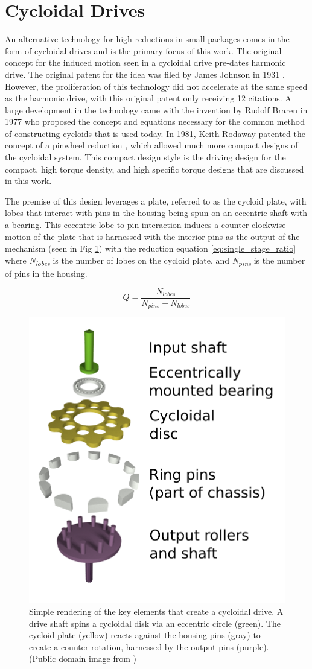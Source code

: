 \section{Cycloidal Drives} \label{intro:cycloid}

An alternative technology for high reductions in small packages comes in the form of cycloidal drives and is the primary focus of this work. The original concept for the induced motion seen in a cycloidal drive pre-dates harmonic drive. The original patent for the idea was filed by James Johnson in 1931 \cite{ref:cycloid_original}. However, the proliferation of this technology did not accelerate at the same speed as the harmonic drive, with this original patent only receiving 12 citations. A large development in the technology came with the invention by Rudolf Braren in 1977 \cite{ref:cycloid_one_stage} who proposed the concept and equations necessary for the common method of constructing cycloids that is used today. In 1981, Keith Rodaway patented the concept of a pinwheel reduction \cite{ref:cycloid_pinwheel}, which allowed much more compact designs of the cycloidal system. This compact design style is the driving design for the compact, high torque density, and high specific torque designs that are discussed in this work.

The premise of this design leverages a plate, referred to as the cycloid plate, with lobes that interact with pins in the housing being spun on an eccentric shaft with a bearing.
This eccentric lobe to pin interaction induces a counter-clockwise motion of the plate that is harnessed with the interior pins as the output of the mechanism (seen in Fig \ref{fig:cycloid_cartoon}) with the reduction equation \ref{eq:single_stage_ratio} where \textit{N\textsubscript{lobes}} is the number of lobes on the cycloid plate, and \textit{N\textsubscript{pins}} is the number of pins in the housing. 

\begin{equation} \label{eq:single_stage_ratio}
Q = \frac{N_{lobes}} {N_{pins} - N_{lobes}}
\end{equation}

\begin{figure}[t]
   \centering
   \includegraphics[width=0.40\linewidth]{fig/Cycloidal_drive_parts}
   \caption{Simple rendering of the key elements that create a cycloidal drive.
   A drive shaft spins a cycloidal disk via an eccentric circle (green).
   The cycloid plate (yellow) reacts against the housing pins (gray) to create a counter-rotation, harnessed by the output pins (purple). (Public domain image from \cite{ref:cycloid_cartoon})}
   \label{fig:cycloid_cartoon}
\end{figure}

